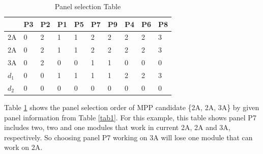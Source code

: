 \documentclass[conference]{IEEEtran}
\begin{document}
\begin{table}[htbp] 
\caption{Panel selection Table}
\begin{center}
\begin{tabular}{l|lllllllll}
        & P3 & P2 & P1 & P5 & P7 & P9 & P4 & P6 & P8 \\ \hline 
2A     & 0  & 2  & 1  & 1  & 2  & 2  & 2  & 2  & 3  \\
2A     & 0  & 2  & 1  & 1  & 2  & 2  & 2  & 2  & 3  \\
3A     & 0  & 2  & 0  & 0  & 1  & 1  & 0  & 0  & 0  \\
$d_1$ & 0  & 0  & 1  & 1  & 1  & 1  & 2  & 2  & 3  \\
$d_2$ & 0  & 0  & 0  & 0  & 0  & 0  & 0  & 0  & 0 
\end{tabular}\label{sorted}
\end{center}
\end{table}
Table \ref{sorted} shows the panel selection order of MPP candidate \{2A, 2A, 3A\} by given panel information from Table \ref{tab1}. For this example, this table shows panel P7 includes two, two and one modules that work in current 2A, 2A and 3A, respectively. So choosing panel P7 working on 3A will lose one module that can work on 2A.
\end{document}
